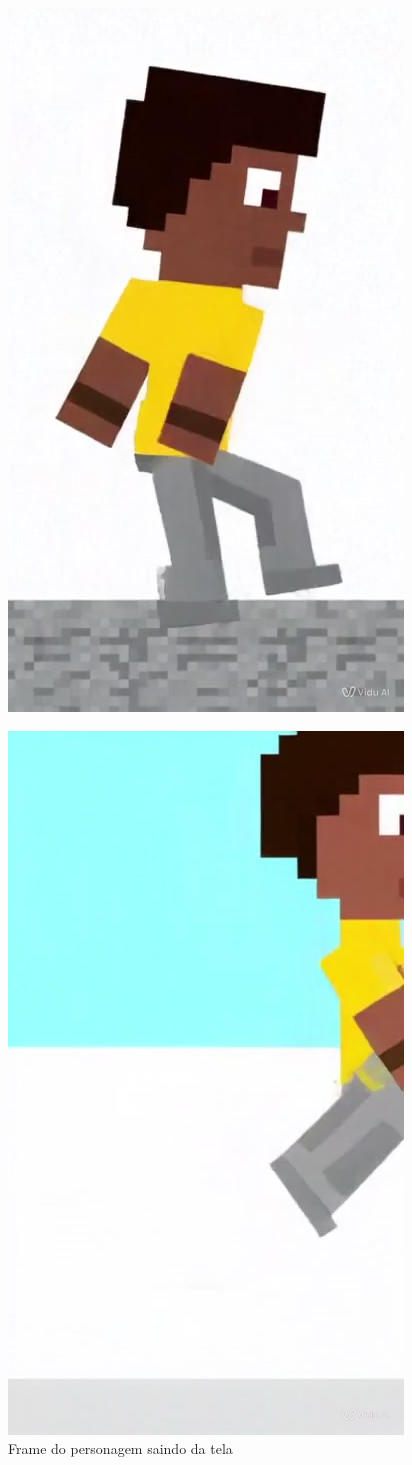 \begin{figure}[htbp]
    \centering
    \begin{minipage}{0.45\textwidth}
    \centering
    \caption{\small Frame do personagem girando para outra direção}
    \includegraphics[width=0.6\linewidth]{figs/vidu/frameGirar.jpg}
    \label{fig:viduGirar}
    \end{minipage}\hfill
    \begin{minipage}{0.45\textwidth}
    \centering
    \caption{\small Frame do personagem saindo da tela}    
    \includegraphics[width=0.6\linewidth]{figs/vidu/frameSairTela.jpg}

\end{minipage}
\end{figure}
